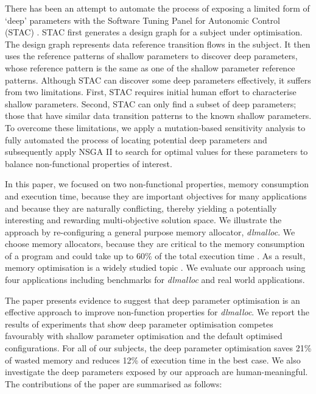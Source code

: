 There has been an attempt to automate the process of exposing a limited form of `deep' parameters with the Software Tuning Panel for Autonomic Control (STAC) \cite{Brake:2008:ADS:1370018.1370031}. STAC first generates a design graph for a subject under optimisation. The design graph represents data reference transition flows in the subject. It then uses the reference patterns of shallow parameters to discover deep parameters, whose reference pattern is the same as one of the shallow parameter reference patterns. Although STAC can discover some deep parameters effectively, it suffers from two limitations. First, STAC requires initial human effort to characterise shallow parameters. Second, STAC can only find a subset of deep parameters; those that have similar data transition patterns to the known shallow parameters. To overcome these limitations, we apply a mutation-based sensitivity analysis to fully automated the process of locating potential deep parameters and subsequently apply NSGA II to search for optimal values for these parameters to balance non-functional properties of interest. 

In this paper, we focused on two non-functional properties, memory consumption and execution time, because they are important objectives for many applications and because they are naturally conflicting, thereby yielding a potentially interesting and rewarding multi-objective solution space. We illustrate the approach by re-configuring a general purpose memory allocator, \emph{dlmalloc}. We choose memory allocators, because they are critical to the memory consumption of a program and could take up to 60\% of the total execution time \cite{Zorn:1992:EMS:142181.142200}. As a result, memory optimisation is a widely studied topic \cite{Risco-Martin:2009:ODM:1569901.1570116,RiscoMartin2010572}. We evaluate our approach using four applications including benchmarks for \emph{dlmalloc} and real world applications.

The paper presents evidence to suggest that deep parameter optimisation is an effective approach to improve non-function properties for \emph{dlmalloc}. 
We report the results of experiments that show deep parameter optimisation competes favourably with shallow parameter optimisation and the default optimised configurations. For all of our subjects, the deep parameter optimisation saves 21\% of wasted memory and reduces 12\% of execution time in the best case. We also investigate the deep parameters exposed by our approach are human-meaningful. The contributions of the paper are summarised as follows:


